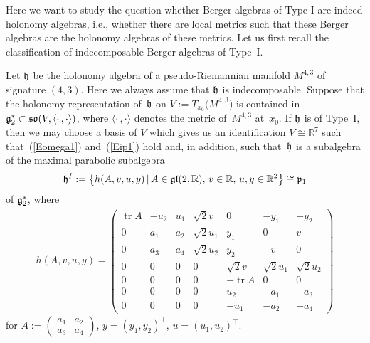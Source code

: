 \documentclass[11pt]{article}
\numberwithin{equation}{section}
\newcommand\fg{{\frak{g}}}
\newcommand\fh{{\frak h}}
\newcommand\fp{{\frak p}}
\newcommand{\fgl}{\mathop{{\frak g \frak l}}}
\newcommand{\fso}{\mathop{{\frak s \frak o}}}
\newcommand\RR{{\mathbb R}}
\newcommand\ip{{\langle\cdot \,,\cdot \rangle}}
\newcommand{\tr}{\operatorname{tr}}
\begin{document}
Here we want to study the question whether Berger algebras of Type I are indeed holonomy algebras, i.e., whether there are local metrics such that these Berger algebras are the holonomy algebras of these metrics. Let us first recall the classification of indecomposable Berger algebras of Type~I.

Let $\fh$ be the holonomy algebra of a pseudo-Riemannian manifold $M^{4,3}$ of signature $(4,3)$. Here we always assume that $\fh$ is indecomposable. Suppose that the holonomy representation of~$\fh$ on $V:=T_{x_0}\big(M^{4,3}\big)$ is contained in $\fg_2^*\subset \fso(V,\ip)$, where $\ip$ denotes the metric of~$M^{4,3}$ at~$x_0$. If $\fh$ is of Type~I, then we may choose a basis of $V$ which gives us an identification $V\cong\RR^7$ such that~(\ref{Eomega1}) and~(\ref{Eip1}) hold and, in addition, such that~$\fh$ is a subalgebra of the maximal parabolic subalgebra
\begin{gather}\label{EhI}
\fh^I:=\big\{ h(A,v,u,y)\,|\, A\in\fgl(2,\RR),\, v\in\RR,\, u, y \in\RR^2\big\}\cong \fp_1
\end{gather}
of $\fg_2^*$, where
\begin{gather*}h(A,v, u,y)= \left(
\begin{matrix}
\tr A &-u_2&u_1&\sqrt 2 v&0&-y_1&-y_2\\
0&a_1&a_2&\sqrt 2 u_1&y_1&0&v\\
0&a_3&a_4&\sqrt 2 u_2&y_2&-v&0\\
0&0&0&0&\sqrt 2 v&\sqrt 2 u_1&\sqrt 2 u_2\\
0&0&0&0&-\tr A&0&0\\
0&0&0&0&u_2&-a_1&-a_3\\
0&0&0&0&-u_1&-a_2&-a_4
	\end{matrix}\right)\end{gather*}
for	$ A:=\left(\begin{smallmatrix} a_1&a_2\\a_3&a_4\end{smallmatrix}\right)$, $y=(y_1,y_2)^\top$, $u=(u_1,u_2)^\top$.
\end{document}
